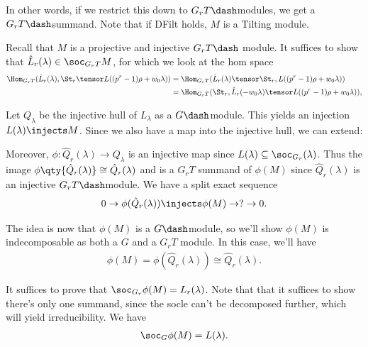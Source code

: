 In other words, if we restrict this down to \(G_r T\dash\)modules, we
get a \(G_r T\dash\)summand. Note that if DFilt holds, \(M\) is a
Tilting module.

Recall that \(M\) is a projective and injective \(G_r T\dash\) module.
It suffices to show that \(\hat{L}_r(\lambda)\in \soc_{G_r T} M\), for
which we look at the hom space
\begin{align*}  
\Hom_{G_r T} (\hat{L}_r(\lambda), \St_r \tensor L( (p^r-1)\rho + w_0 \lambda ) )
&= \Hom_{G_r T} (\hat{L}_r(\lambda) \tensor \St_r, L( (p^r-1)\rho + w_0 \lambda ) ) \\
&= \Hom_{G_r T} (\St_r, \hat{L}_r(-w_0 \lambda) \tensor L( (p^r-1)\rho + w_0 \lambda ) ) 
,\end{align*}


Let \(Q_\lambda\) be the injective hull of \(L_\lambda\) as a
\(G\dash\)module. This yields an injection \(L(\lambda)\injects M\).
Since we also have a map into the injective hull, we can extend:

\begin{center}
\end{center}

Moreover, \(\phi:\hat{Q}_r(\lambda)\to Q_\lambda\) is an injective map
since \(L(\lambda) \subseteq \soc_{G_r}(\lambda)\). Thus the image
\(\phi\qty{\hat{Q}_r(\lambda) } \cong \hat{Q}_r(\lambda)\) and is a
\(G_r T\) summand of \(\phi(M)\) since \(\hat{Q}_r(\lambda)\) is an
injective \(G_r T\dash\)module. We have a split exact sequence
\begin{align*}  
0 \to \phi(\hat{Q}_r(\lambda)) \injects \phi(M) \to ? \to 0
.\end{align*}

The idea is now that \(\phi(M)\) is a \(G\dash\)module, so we'll show
\(\phi(M)\) is indecomposable as both a \(G\) and a \(G_r T\) module. In
this case, we'll have
\begin{align*}  
\phi(M) = \phi(\hat{Q}_r(\lambda)) \cong \hat{Q}_r(\lambda)
.\end{align*}

It suffices to prove that \(\soc_{G_r} \phi(M) = L_r(\lambda)\). Note
that that it suffices to show there's only one summand, since the socle
can't be decomposed further, which will yield irreducibility. We have
\begin{align*}  
\soc_G \phi(M) = L(\lambda)
.\end{align*}

